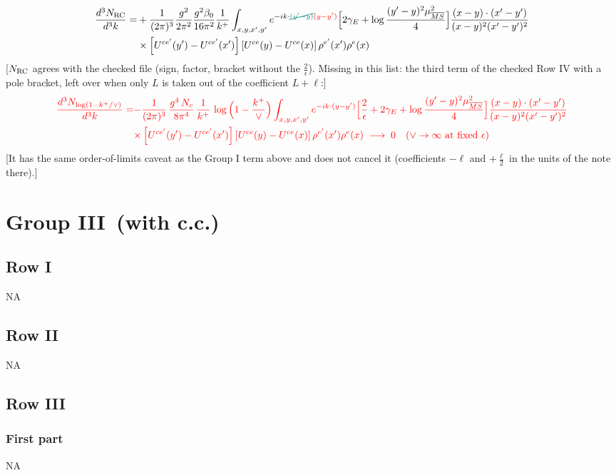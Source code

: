 \documentclass[9pt]{article}
\numberwithin{equation}{section}
\begin{document}
\begin{align}
\frac{d^{3}N_{\rm RC}}{d^{3}k}= & +\frac{1}{(2\pi)^{3}}\frac{g^{2}}{2\pi^{2}}\frac{g^{2}\beta_{0}}{16\pi^{2}}\frac{1}{k^{+}}\int_{x,y,x',y'}e^{-ik\cdot{\color{teal}\cancel{(y'-y)}}{\color{red}(y-y')}}\Big[2\gamma_{E}+\log\frac{(y'-y)^{2}\mu^{2}_{\overline{MS}}}{4}\Big]\frac{(x-y)\cdot(x'-y')}{(x-y)^{2}(x'-y')^{2}}\notag\\
&\times\left[U^{ce'}(y') - U^{ce'}(x')\right]\left[U^{ce}(y) - U^{ce}(x)\right]\rho^{e'}(x')\rho^{e}(x)
\end{align} {\color{red}[$N_{\rm RC}$ agrees with the checked file (sign, factor, bracket without the $\frac{2}{\epsilon}$). Missing in this list: the third term of the checked Row IV with a pole bracket, left over when only $L$ is taken out of the coefficient $L+\ell$:]} \begin{align} {\color{red}\frac{d^{3}N_{\log(1-k^{+}/\vee)}}{d^{3}k}=} & {\color{red}-\frac{1}{(2\pi)^{3}}\,\frac{g^{4}\,N_{c}}{8\pi^{4}}\,\frac{1}{k^{+}}\,\log\Big(1-\frac{k^{+}}{\vee}\Big)\int_{x,y,x',y'}e^{-ik\cdot(y-y')}\Big[\frac{2}{\epsilon}+2\gamma_{E}+\log\frac{(y'-y)^{2}\mu^{2}_{\overline{MS}}}{4}\Big]\frac{(x-y)\cdot(x'-y')}{(x-y)^{2}(x'-y')^{2}}}\notag \\ & {\color{red}\times\left[U^{ce'}(y') - U^{ce'}(x')\right]\left[U^{ce}(y) - U^{ce}(x)\right]\rho^{e'}(x')\rho^{e}(x)\;\longrightarrow\;0\quad(\vee\to\infty\ \text{at fixed }\epsilon)} \end{align} {\color{red}[It has the same order-of-limits caveat as the Group I term above and does not cancel it (coefficients $-\ell$ and $+\frac{\ell}{2}$ in the units of the note there).]}\par\noindent
\section{Group III\, (with c.c.)}
\subsection{Row I}
\textsc{NA}
\subsection{Row II}
\textsc{NA}
 \subsection{Row III}
\subsubsection{First part}
\textsc{NA}
\end{document}
